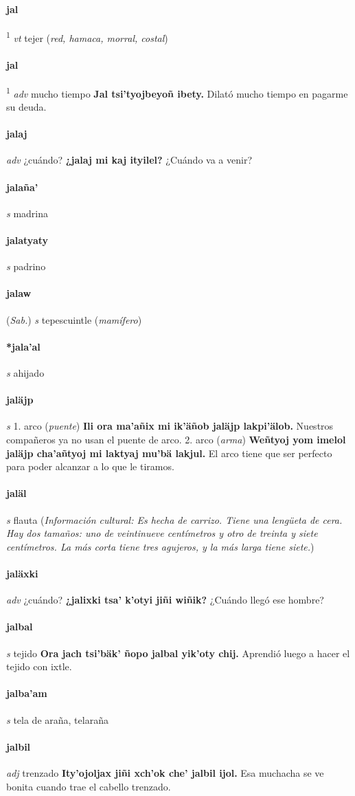 \documentclass{scrbook}
\newcommand{\entry}[1]{\paragraph{#1}}
\newcommand{\onedefinition}[1]{#1.}
\newcommand{\defsuperscript}[1]{\textsuperscript{1}}
\newcommand{\partofspeech}[1]{\textit{#1}}
\newcommand{\spanishtranslation}[1]{#1}
\newcommand{\clarification}[1]{(\textit{#1})}
\newcommand{\cholexample}[1]{\textbf{#1}}
\newcommand{\exampletranslation}[1]{#1}
\newcommand{\relevantdialect}[1]{(\textit{#1})}
\newcommand{\culturalinformation}[1]{(\textit{#1})}
\begin{document}
\begin{multicols}{2}
\entry{jal}
\defsuperscript{1}
\partofspeech{vt}
\spanishtranslation{tejer}
\clarification{red, hamaca, morral, costal}

\entry{jal}
\defsuperscript{2}
\partofspeech{adv}
\spanishtranslation{mucho tiempo}
\cholexample{Jal tsi'tyojbeyoñ ibety.}
\exampletranslation{Dilató mucho tiempo en pagarme su deuda.}

\entry{jalaj}
\partofspeech{adv}
\spanishtranslation{¿cuándo?}
\cholexample{¿jalaj mi kaj ityilel?}
\exampletranslation{¿Cuándo va a venir?}

\entry{jalaña'}
\partofspeech{s}
\spanishtranslation{madrina}

\entry{jalatyaty}
\partofspeech{s}
\spanishtranslation{padrino}

\entry{jalaw}
\relevantdialect{Sab.}
\partofspeech{s}
\spanishtranslation{tepescuintle}
\clarification{mamífero}

\entry{*jala'al}
\partofspeech{s}
\spanishtranslation{ahijado}

\entry{jaläjp}
\partofspeech{s}
\onedefinition{1}
\spanishtranslation{arco}
\clarification{puente}
\cholexample{Ili ora ma'añix mi ik'äñob jaläjp lakpi'älob.}
\exampletranslation{Nuestros compañeros ya no usan el puente de arco.}
\onedefinition{2}
\spanishtranslation{arco}
\clarification{arma}
\cholexample{Weñtyoj yom imelol jaläjp cha'añtyoj mi laktyaj mu'bä lakjul.}
\exampletranslation{El arco tiene que ser perfecto para poder alcanzar a lo que le tiramos.}

\entry{jaläl}
\partofspeech{s}
\spanishtranslation{flauta}
\culturalinformation{Información cultural: Es hecha de carrizo. Tiene una lengüeta de cera. Hay dos tamaños: uno de veintinueve centímetros y otro de treinta y siete centímetros. La más corta tiene tres agujeros, y la más larga tiene siete.}

\entry{jaläxki}
\partofspeech{adv}
\spanishtranslation{¿cuándo?}
\cholexample{¿jalixki tsa' k'otyi jiñi wiñik?}
\exampletranslation{¿Cuándo llegó ese hombre?}

\entry{jalbal}
\partofspeech{s}
\spanishtranslation{tejido}
\cholexample{Ora jach tsi'bäk' ñopo jalbal yik'oty chij.}
\exampletranslation{Aprendió luego a hacer el tejido con ixtle.}

\entry{jalba'am}
\partofspeech{s}
\spanishtranslation{tela de araña, telaraña}

\entry{jalbil}
\partofspeech{adj}
\spanishtranslation{trenzado}
\cholexample{Ity'ojoljax jiñi xch'ok che' jalbil ijol.}
\exampletranslation{Esa muchacha se ve bonita cuando trae el cabello trenzado.}


\end{multicols}
\end{document}
